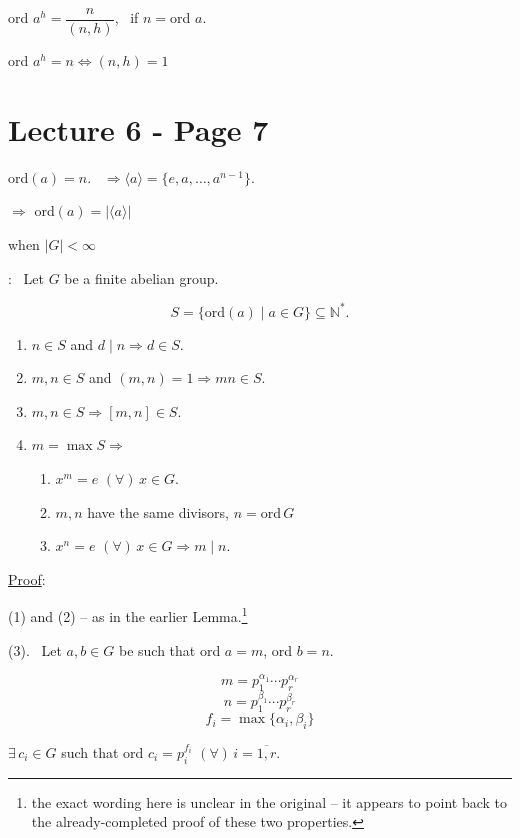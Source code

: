 \bigskip
\noindent ord $a^h = \dfrac{n}{(n,h)}$, \ if $n=$ord $a$.

\bigskip
\noindent ord $a^h = n \Leftrightarrow (n,h)=1$



\section*{Lecture 6 - Page 7}

\noindent ord$(a)=n$. \ $\Rightarrow \langle a\rangle = \{e,a,\ldots,a^{n-1}\}$.

\noindent $\Rightarrow$ ord$(a) = |\langle a\rangle|$

\noindent when $|G|<\infty$

\bigskip
\noindent{}: \ Let $G$ be a finite abelian group.

\[
S=\{\text{ord}(a) \mid a\in G\} \subseteq \mathbb{N}^*.
\]

\begin{enumerate}
\item[(1)] $n\in S$ and $d\mid n \Rightarrow d\in S$.
\item[(2)] $m,n\in S$ and $(m,n)=1 \Rightarrow mn\in S$.
\item[(3)] $m,n\in S \Rightarrow [m,n]\in S$.
\item[(4)] $m=\max S \Rightarrow$
\begin{enumerate}
\item[(a)] $x^m=e$ $(\forall)\,x\in G$.
\item[(b)] $m,n$ have the same divisors, $n=$ord$\,G$
\item[(c)] $x^n=e$ $(\forall)\,x\in G \Rightarrow m\mid n$.
\end{enumerate}
\end{enumerate}

\bigskip
\noindent\underline{Proof}:

\noindent (1) and (2) -- as in the earlier Lemma.\footnote{the exact wording here is unclear in the original -- it appears to point back to the already-completed proof of these two properties.}

\bigskip
\noindent (3). \ Let $a,b\in G$ be such that ord $a=m$, ord $b=n$.

\[
m=p_1^{\alpha_1}\cdots p_r^{\alpha_r}
\]
\[
n=p_1^{\beta_1}\cdots p_r^{\beta_r}
\]
\[
f_i=\max\{\alpha_i,\beta_i\}
\]

\noindent $\exists\, c_i\in G$ such that ord $c_i=p_i^{f_i}$ $(\forall)\,i=\overline{1,r}$.

